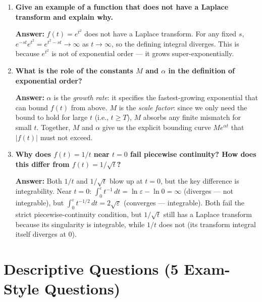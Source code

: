 \documentclass[12pt,a4paper]{article}
\begin{document}
\begin{enumerate}[label=\textbf{Q\arabic*.}]
\textbf{Answer:} $\lim_{s \to \infty} F(s) = 0$. This is a necessary consequence of existence. It is useful as a quick sanity check: if a computed $F(s)$ does not vanish as $s \to \infty$, there is an error in the calculation.

\item \textbf{Give an example of a function that does not have a Laplace transform and explain why.}

\textbf{Answer:} $f(t) = e^{t^2}$ does not have a Laplace transform. For any fixed $s$, $e^{-st} e^{t^2} = e^{t^2 - st} \to \infty$ as $t \to \infty$, so the defining integral diverges. This is because $e^{t^2}$ is not of exponential order --- it grows super-exponentially.

\item \textbf{What is the role of the constants $M$ and $\alpha$ in the definition of exponential order?}

\textbf{Answer:} $\alpha$ is the \emph{growth rate}: it specifies the fastest-growing exponential that can bound $f(t)$ from above. $M$ is the \emph{scale factor}: since we only need the bound to hold for large $t$ (i.e., $t \geq T$), $M$ absorbs any finite mismatch for small $t$. Together, $M$ and $\alpha$ give us the explicit bounding curve $M e^{\alpha t}$ that $|f(t)|$ must not exceed.

\item \textbf{Why does $f(t) = 1/t$ near $t = 0$ fail piecewise continuity? How does this differ from $f(t) = 1/\sqrt{t}$?}

\textbf{Answer:} Both $1/t$ and $1/\sqrt{t}$ blow up at $t = 0$, but the key difference is integrability. Near $t = 0$: $\int_0^{\varepsilon} t^{-1}\, dt = \ln \varepsilon - \ln 0 = \infty$ (diverges --- not integrable), but $\int_0^{\varepsilon} t^{-1/2}\, dt = 2\sqrt{\varepsilon}$ (converges --- integrable). Both fail the strict piecewise-continuity condition, but $1/\sqrt{t}$ still has a Laplace transform because its singularity is integrable, while $1/t$ does not (its transform integral itself diverges at 0).

\end{enumerate}

\section{Descriptive Questions (5 Exam-Style Questions)}
\end{document}
